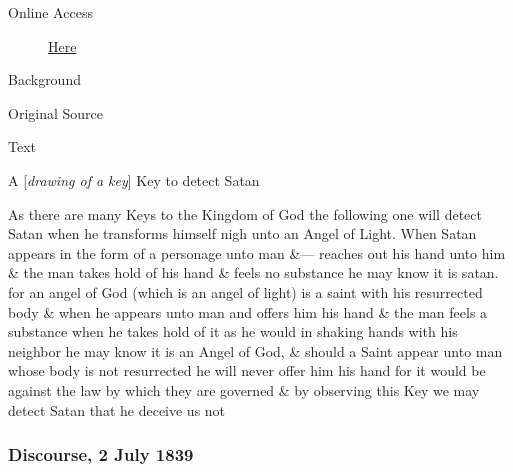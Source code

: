 				\begin{description}
					\item[Online Access] \href{https://www.josephsmithpapers.org/paper-summary/discourse-27-june-1839-as-reported-by-willard-richards/1}{Here}
				\end{description}
				
				\begin{description}
					\item[Background]
				\end{description}
				
				
				\begin{description}
					\item[Original Source]
				\end{description}
				
				
				\begin{description}
					\item[Text]
				\end{description}
				
					\begin{tightcenter}
					A [\textit{drawing of a key}] Key to detect Satan
					\end{tightcenter}
					
					As there are many Keys to the Kingdom of God the following one will detect Satan when he transforms himself nigh unto an Angel of Light. When Satan appears in the form of a personage unto man \&--- reaches out his hand unto him \& the man takes hold of his hand \& feels no substance he may know it is satan. for an angel of God (which is an angel of light) is a saint with his resurrected body \& when he appears unto man and offers him his hand \& the man feels a substance when he takes hold of it as he would in shaking hands with his neighbor he may know it is an Angel of God, \& should a Saint appear unto man whose body is not resurrected he will never offer him his hand for it would be against the law by which they are governed \& by observing this Key we may detect Satan that he deceive us not
					
		\subsubsection{Discourse, 2 July 1839}
			\label{EMS-1839-JS-2-JUL-1839}
			
